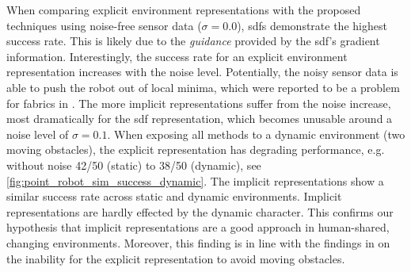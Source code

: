 When comparing explicit environment representations with the proposed techniques
using noise-free sensor data ($\sigma=0.0$), \acp{sdf} demonstrate the highest
success rate. This is likely due to the \textit{guidance} provided by the
\ac{sdf}'s gradient information. Interestingly, the success
rate for an explicit environment representation increases
with the noise level. Potentially, the noisy sensor data is
able to push the robot out of local minima, which were
reported to be a problem for \ac{fabrics} in
\cite{Spahn2023}. The more implicit representations suffer
from the noise increase, most dramatically for the
\ac{sdf} representation, which becomes unusable around a
noise level of $\sigma=0.1$. When exposing all methods to a
dynamic environment (two moving obstacles), the explicit
representation has degrading performance, e.g. without noise 42/50 (static) to
38/50 (dynamic), see
\cref{fig:point_robot_sim_success_dynamic}.
The implicit representations show a similar success rate
across static and dynamic environments.
Implicit
representations are hardly effected by the dynamic
character. This confirms our hypothesis that implicit
representations are a good approach in human-shared,
changing environments. Moreover, this finding is in line with the findings in
\cite{Spahn2023} on the inability for the explicit
representation to avoid moving obstacles.

